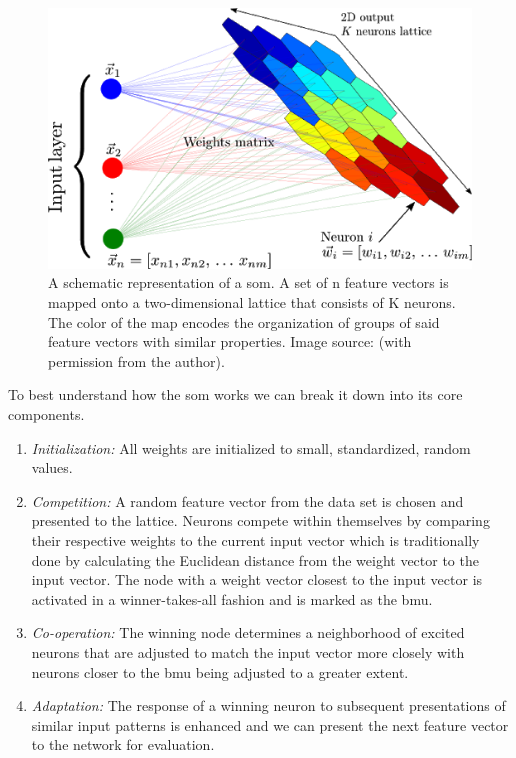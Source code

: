 \begin{figure}[H]
    \centering
    \includegraphics[width=\textwidth]{Images/Chapter 3/SOM/SOM-Illustration.png}
    \caption{A schematic representation of a \gls{som}. A set of n feature vectors is mapped onto a two-dimensional lattice that consists of K neurons. The color of the map encodes the organization of groups of said feature vectors with similar properties. Image source: \cite{Carrasco} (with permission from the author).}
    \label{fig:SOM-Illustration}
\end{figure}

\noindent \newline To best understand how the \gls{som} works we can break it down into its core components.

\begin{enumerate}
    \item \textit{Initialization:} All weights are initialized to small, standardized, random values.
    \item \textit{Competition:} A random feature vector from the data set is chosen and presented to the lattice. Neurons compete within themselves by comparing their respective weights to the current input vector which is traditionally done by calculating the Euclidean distance from the weight vector to the input vector. The node with a weight vector closest to the input vector is activated in a winner-takes-all fashion and is marked as the \gls{bmu}.
    \item \textit{Co-operation:} The winning node determines a neighborhood of excited neurons that are adjusted to match the input vector more closely with neurons closer to the \gls{bmu} being adjusted to a greater extent.
    \item \textit{Adaptation:} The response of a winning neuron to subsequent presentations of similar input patterns is enhanced and we can present the next feature vector to the network for evaluation.
\end{enumerate}

